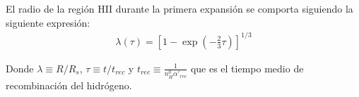 







El radio de la región HII durante la primera expansión se comporta siguiendo la siguiente expresión:
\begin{align}
  \lambda(\tau) = \left[1 - \exp\left(-\frac{2}{3}\tau\right)\right]^{1/3} \label{eq:lambda-tau}
\end{align}

Donde $\lambda\equiv R/R_s$, $\tau\equiv t/t_{rec}$ y $t_{rec}\equiv \frac{1}{n^0_H \alpha'_{rec}}$ que es el tiempo medio de recombinación del hidrógeno.

